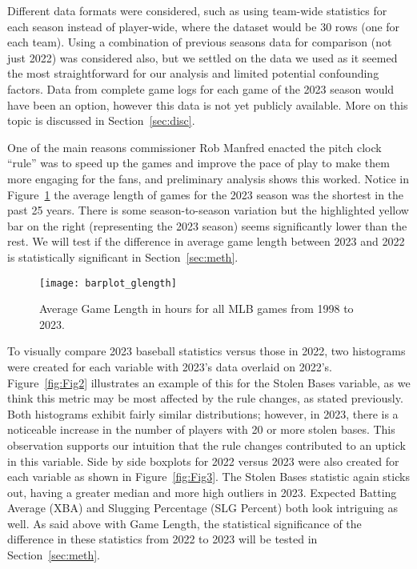 \documentclass[12pt]{article}
\begin{document}
Different data formats were considered, such as using team-wide statistics
for each season instead of player-wide, where the dataset would be 30 rows (one
for each team). Using a combination of previous seasons data for comparison (not
just 2022) was considered also, but we settled on the data we used as it seemed
the most straightforward for our analysis and limited potential confounding
factors. Data from complete game logs for each game of the 2023 season would have
been an option, however this data is not yet publicly available. More on this topic
is discussed in Section~\ref{sec:disc}.

One of the main reasons commissioner Rob Manfred enacted the pitch clock ``rule''
was to speed up the games and improve the pace of play to make them more engaging
for the fans, and preliminary analysis shows this worked. Notice in Figure~\ref{fig:Fig1}
the average length of games for the 2023 season was the shortest in the past 25 years.
There is some season-to-season variation but the highlighted yellow bar on the right
(representing the 2023 season) seems significantly lower than the rest. We will
test if the difference in average game length between 2023 and 2022 is statistically
significant in Section~\ref{sec:meth}.

\begin{figure}[tbp]
  \centering
  \texttt{[image: barplot\_glength]}
  \caption{Average Game Length in hours for all MLB games from 1998 to 2023.}
  \label{fig:Fig1}
\end{figure}

To visually compare 2023 baseball statistics versus those in 2022, two histograms
were created for each variable with 2023's data overlaid on 2022's. Figure~\ref{fig:Fig2}
illustrates an example of this for the Stolen Bases variable, as we think this
metric may be most affected by the rule changes, as stated previously. Both
histograms exhibit fairly similar distributions; however, in 2023, there is a
noticeable increase in the number of players with 20 or more stolen bases. This
observation supports our intuition that the rule changes contributed to an uptick
in this variable. Side by side boxplots for 2022 versus 2023 were also created for
each variable as shown in Figure~\ref{fig:Fig3}. The Stolen Bases statistic again
sticks out, having a greater median and more high outliers in 2023. Expected Batting Average (XBA)
and Slugging Percentage (SLG Percent) both look intriguing as well. As said above
with Game Length, the statistical significance of the difference in these statistics
from 2022 to 2023 will be tested in Section~\ref{sec:meth}.
\end{document}
